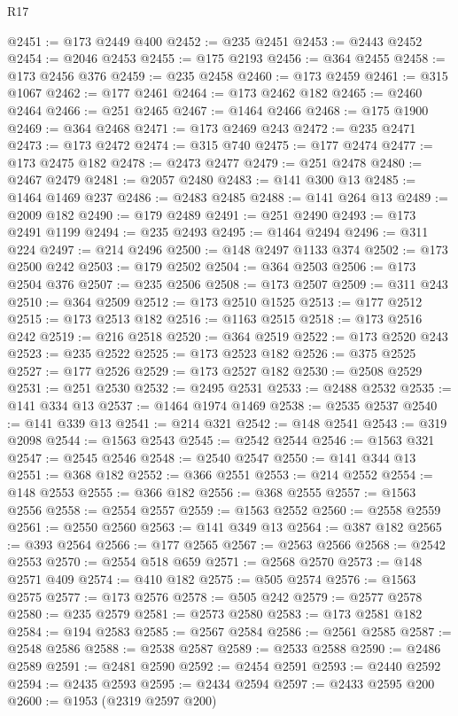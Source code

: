 \begin{lexlean}{R17}
\begin{coremodule}
@2451 := @173 @2449 @400
@2452 := @235 @2451
@2453 := @2443 @2452
@2454 := @2046 @2453
@2455 := @175 @2193
@2456 := @364 @2455
@2458 := @173 @2456 @376
@2459 := @235 @2458
@2460 := @173 @2459
@2461 := @315 @1067
@2462 := @177 @2461
@2464 := @173 @2462 @182
@2465 := @2460 @2464
@2466 := @251 @2465
@2467 := @1464 @2466
@2468 := @175 @1900
@2469 := @364 @2468
@2471 := @173 @2469 @243
@2472 := @235 @2471
@2473 := @173 @2472
@2474 := @315 @740
@2475 := @177 @2474
@2477 := @173 @2475 @182
@2478 := @2473 @2477
@2479 := @251 @2478
@2480 := @2467 @2479
@2481 := @2057 @2480
@2483 := @141 @300 @13
@2485 := @1464 @1469 @237
@2486 := @2483 @2485
@2488 := @141 @264 @13
@2489 := @2009 @182
@2490 := @179 @2489
@2491 := @251 @2490
@2493 := @173 @2491 @1199
@2494 := @235 @2493
@2495 := @1464 @2494
@2496 := @311 @224
@2497 := @214 @2496
@2500 := @148 @2497 @1133 @374
@2502 := @173 @2500 @242
@2503 := @179 @2502
@2504 := @364 @2503
@2506 := @173 @2504 @376
@2507 := @235 @2506
@2508 := @173 @2507
@2509 := @311 @243
@2510 := @364 @2509
@2512 := @173 @2510 @1525
@2513 := @177 @2512
@2515 := @173 @2513 @182
@2516 := @1163 @2515
@2518 := @173 @2516 @242
@2519 := @216 @2518
@2520 := @364 @2519
@2522 := @173 @2520 @243
@2523 := @235 @2522
@2525 := @173 @2523 @182
@2526 := @375 @2525
@2527 := @177 @2526
@2529 := @173 @2527 @182
@2530 := @2508 @2529
@2531 := @251 @2530
@2532 := @2495 @2531
@2533 := @2488 @2532
@2535 := @141 @334 @13
@2537 := @1464 @1974 @1469
@2538 := @2535 @2537
@2540 := @141 @339 @13
@2541 := @214 @321
@2542 := @148 @2541
@2543 := @319 @2098
@2544 := @1563 @2543
@2545 := @2542 @2544
@2546 := @1563 @321
@2547 := @2545 @2546
@2548 := @2540 @2547
@2550 := @141 @344 @13
@2551 := @368 @182
@2552 := @366 @2551
@2553 := @214 @2552
@2554 := @148 @2553
@2555 := @366 @182
@2556 := @368 @2555
@2557 := @1563 @2556
@2558 := @2554 @2557
@2559 := @1563 @2552
@2560 := @2558 @2559
@2561 := @2550 @2560
@2563 := @141 @349 @13
@2564 := @387 @182
@2565 := @393 @2564
@2566 := @177 @2565
@2567 := @2563 @2566
@2568 := @2542 @2553
@2570 := @2554 @518 @659
@2571 := @2568 @2570
@2573 := @148 @2571 @409
@2574 := @410 @182
@2575 := @505 @2574
@2576 := @1563 @2575
@2577 := @173 @2576
@2578 := @505 @242
@2579 := @2577 @2578
@2580 := @235 @2579
@2581 := @2573 @2580
@2583 := @173 @2581 @182
@2584 := @194 @2583
@2585 := @2567 @2584
@2586 := @2561 @2585
@2587 := @2548 @2586
@2588 := @2538 @2587
@2589 := @2533 @2588
@2590 := @2486 @2589
@2591 := @2481 @2590
@2592 := @2454 @2591
@2593 := @2440 @2592
@2594 := @2435 @2593
@2595 := @2434 @2594
@2597 := @2433 @2595 @200
@2600 := @1953 (@2319 @2597 @200)

\end{coremodule}
\end{lexlean}
